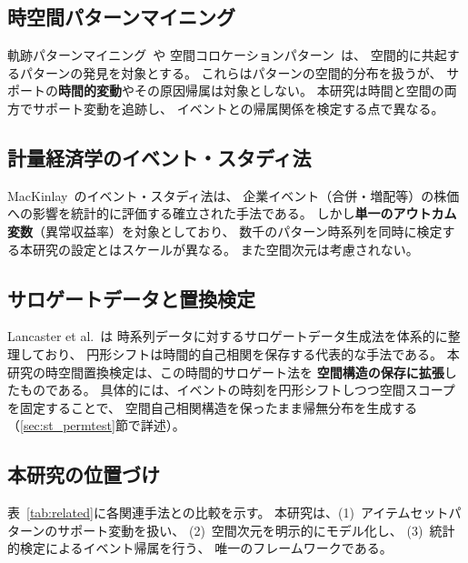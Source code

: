 \subsection{時空間パターンマイニング}

軌跡パターンマイニング~\cite{giannotti2007trajectory}や
空間コロケーションパターン~\cite{shekhar2001colocation}は、
空間的に共起するパターンの発見を対象とする。
これらはパターンの空間的分布を扱うが、
サポートの\textbf{時間的変動}やその原因帰属は対象としない。
本研究は時間と空間の両方でサポート変動を追跡し、
イベントとの帰属関係を検定する点で異なる。

\subsection{計量経済学のイベント・スタディ法}

MacKinlay~\cite{mackinlay1997event}のイベント・スタディ法は、
企業イベント（合併・増配等）の株価への影響を統計的に評価する確立された手法である。
しかし\textbf{単一のアウトカム変数}（異常収益率）を対象としており、
数千のパターン時系列を同時に検定する本研究の設定とはスケールが異なる。
また空間次元は考慮されない。

\subsection{サロゲートデータと置換検定}

Lancaster et al.~\cite{lancaster2018surrogate}は
時系列データに対するサロゲートデータ生成法を体系的に整理しており、
円形シフトは時間的自己相関を保存する代表的な手法である。
本研究の時空間置換検定は、この時間的サロゲート法を
\textbf{空間構造の保存に拡張}したものである。
具体的には、イベントの時刻を円形シフトしつつ空間スコープを固定することで、
空間自己相関構造を保ったまま帰無分布を生成する（\ref{sec:st_permtest}節で詳述）。

\subsection{本研究の位置づけ}

表~\ref{tab:related}に各関連手法との比較を示す。
本研究は、(1)~アイテムセットパターンのサポート変動を扱い、
(2)~空間次元を明示的にモデル化し、
(3)~統計的検定によるイベント帰属を行う、
唯一のフレームワークである。


